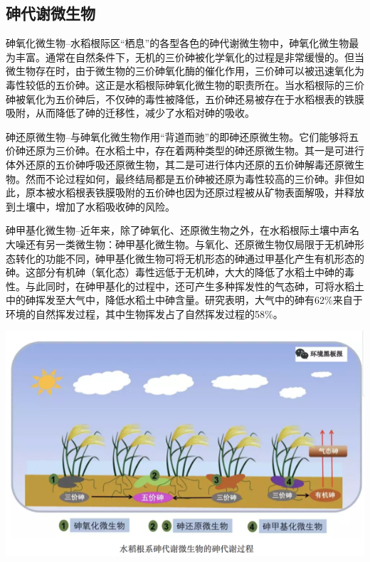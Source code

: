 \documentclass[
]{book}
\begin{document}
\hypertarget{ux7837ux4ee3ux8c22ux5faeux751fux7269}{%
\subsection{砷代谢微生物}\label{ux7837ux4ee3ux8c22ux5faeux751fux7269}}

砷氧化微生物--水稻根际区``栖息''的各型各色的砷代谢微生物中，砷氧化微生物最为丰富。通常在自然条件下，无机的三价砷被化学氧化的过程是非常缓慢的。但当微生物存在时，由于微生物的三价砷氧化酶的催化作用，三价砷可以被迅速氧化为毒性较低的五价砷。这正是水稻根际砷氧化微生物的职责所在。当水稻根际的三价砷被氧化为五价砷后，不仅砷的毒性被降低，五价砷还易被存在于水稻根表的铁膜吸附，从而降低了砷的迁移性，减少了水稻对砷的吸收。

砷还原微生物--与砷氧化微生物作用``背道而驰''的即砷还原微生物。它们能够将五价砷还原为三价砷。在水稻土中，存在着两种类型的砷还原微生物。其一是可进行体外还原的五价砷呼吸还原微生物，其二是可进行体内还原的五价砷解毒还原微生物。然而不论过程如何，最终结局都是五价砷被还原为毒性较高的三价砷。非但如此，原本被水稻根表铁膜吸附的五价砷也因为还原过程被从矿物表面解吸，并释放到土壤中，增加了水稻吸收砷的风险。

砷甲基化微生物--近年来，除了砷氧化、还原微生物之外，在水稻根际土壤中声名大噪还有另一类微生物：砷甲基化微生物。与氧化、还原微生物仅局限于无机砷形态转化的功能不同，砷甲基化微生物可将无机形态的砷通过甲基化产生有机形态的砷。这部分有机砷（氧化态）毒性远低于无机砷，大大的降低了水稻土中砷的毒性。与此同时，在砷甲基化的过程中，还可产生多种挥发性的气态砷，可将水稻土中的砷挥发至大气中，降低水稻土中砷含量。研究表明，大气中的砷有62\%来自于环境的自然挥发过程，其中生物挥发占了自然挥发过程的58\%。

\includegraphics[width=8.33in]{images/as4}
\end{document}
